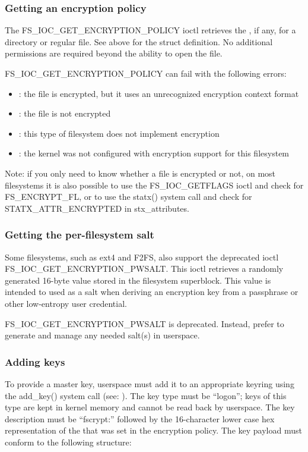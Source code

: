 \documentclass[a4paper,8pt,english]{sphinxmanual}
\begin{document}
\subsubsection{Getting an encryption policy}
\label{filesystems/fscrypt:getting-an-encryption-policy}
The FS\_IOC\_GET\_ENCRYPTION\_POLICY ioctl retrieves the , if any, for a directory or regular file.  See above
for the struct definition.  No additional permissions are required
beyond the ability to open the file.

FS\_IOC\_GET\_ENCRYPTION\_POLICY can fail with the following errors:
\begin{itemize}
\item {} 
: the file is encrypted, but it uses an unrecognized
encryption context format

\item {} 
: the file is not encrypted

\item {} 
: this type of filesystem does not implement encryption

\item {} 
: the kernel was not configured with encryption
support for this filesystem

\end{itemize}

Note: if you only need to know whether a file is encrypted or not, on
most filesystems it is also possible to use the FS\_IOC\_GETFLAGS ioctl
and check for FS\_ENCRYPT\_FL, or to use the statx() system call and
check for STATX\_ATTR\_ENCRYPTED in stx\_attributes.


\subsubsection{Getting the per-filesystem salt}
\label{filesystems/fscrypt:getting-the-per-filesystem-salt}
Some filesystems, such as ext4 and F2FS, also support the deprecated
ioctl FS\_IOC\_GET\_ENCRYPTION\_PWSALT.  This ioctl retrieves a randomly
generated 16-byte value stored in the filesystem superblock.  This
value is intended to used as a salt when deriving an encryption key
from a passphrase or other low-entropy user credential.

FS\_IOC\_GET\_ENCRYPTION\_PWSALT is deprecated.  Instead, prefer to
generate and manage any needed salt(s) in userspace.


\subsubsection{Adding keys}
\label{filesystems/fscrypt:adding-keys}
To provide a master key, userspace must add it to an appropriate
keyring using the add\_key() system call (see:
).  The key type must be
``logon''; keys of this type are kept in kernel memory and cannot be
read back by userspace.  The key description must be ``fscrypt:''
followed by the 16-character lower case hex representation of the
 that was set in the encryption policy.  The
key payload must conform to the following structure:
\end{document}
